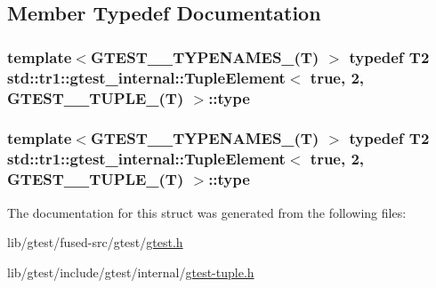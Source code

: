 \subsection{Member Typedef Documentation}
\hypertarget{structstd_1_1tr1_1_1gtest__internal_1_1_tuple_element_3_01true_00_012_00_01_g_t_e_s_t__10___t_u_p_l_e___07_t_08_01_4_a2162d0e4f4c93fb1fdedb1938b844fbe}{
\subsubsection[{type}]{\setlength{\rightskip}{0pt plus 5cm}template$<$G\-T\-E\-S\-T\-\_\-\_\-\-T\-Y\-P\-E\-N\-A\-M\-E\-S\-\_\-(\-T) $>$ typedef T2 {\bf std\-::tr1\-::gtest\-\_\-internal\-::\-Tuple\-Element}$<$ true, 2, {\bf G\-T\-E\-S\-T\-\_\-\_\-\-T\-U\-P\-L\-E\-\_\-}(T) $>$\-::{\bf type}}}\label{structstd_1_1tr1_1_1gtest__internal_1_1_tuple_element_3_01true_00_012_00_01_g_t_e_s_t__10___t_u_p_l_e___07_t_08_01_4_a2162d0e4f4c93fb1fdedb1938b844fbe}
\hypertarget{structstd_1_1tr1_1_1gtest__internal_1_1_tuple_element_3_01true_00_012_00_01_g_t_e_s_t__10___t_u_p_l_e___07_t_08_01_4_a2162d0e4f4c93fb1fdedb1938b844fbe}{
\subsubsection[{type}]{\setlength{\rightskip}{0pt plus 5cm}template$<$G\-T\-E\-S\-T\-\_\-\_\-\-T\-Y\-P\-E\-N\-A\-M\-E\-S\-\_\-(\-T) $>$ typedef T2 {\bf std\-::tr1\-::gtest\-\_\-internal\-::\-Tuple\-Element}$<$ true, 2, {\bf G\-T\-E\-S\-T\-\_\-\_\-\-T\-U\-P\-L\-E\-\_\-}(T) $>$\-::{\bf type}}}\label{structstd_1_1tr1_1_1gtest__internal_1_1_tuple_element_3_01true_00_012_00_01_g_t_e_s_t__10___t_u_p_l_e___07_t_08_01_4_a2162d0e4f4c93fb1fdedb1938b844fbe}


The documentation for this struct was generated from the following files\-:\begin{DoxyCompactItemize}
\item 
lib/gtest/fused-\/src/gtest/\hyperlink{fused-src_2gtest_2gtest_8h}{gtest.\-h}\item 
lib/gtest/include/gtest/internal/\hyperlink{gtest-tuple_8h}{gtest-\/tuple.\-h}\end{DoxyCompactItemize}
